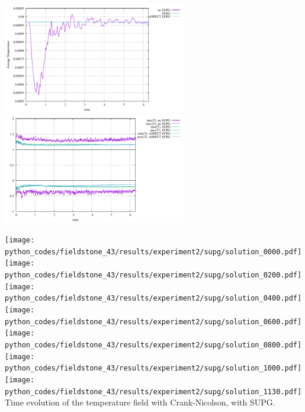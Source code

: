 \begin{center}
\includegraphics[width=8cm]{python_codes/fieldstone_43/results/experiment2/avrg_T}
\includegraphics[width=8cm]{python_codes/fieldstone_43/results/experiment2/stats_T}
\end{center}

\begin{center}
\texttt{[image: python\_codes/fieldstone\_43/results/experiment2/supg/solution\_0000.pdf]}
\texttt{[image: python\_codes/fieldstone\_43/results/experiment2/supg/solution\_0200.pdf]}
\texttt{[image: python\_codes/fieldstone\_43/results/experiment2/supg/solution\_0400.pdf]}
\texttt{[image: python\_codes/fieldstone\_43/results/experiment2/supg/solution\_0600.pdf]}\\
\texttt{[image: python\_codes/fieldstone\_43/results/experiment2/supg/solution\_0800.pdf]}
\texttt{[image: python\_codes/fieldstone\_43/results/experiment2/supg/solution\_1000.pdf]}
\texttt{[image: python\_codes/fieldstone\_43/results/experiment2/supg/solution\_1130.pdf]}\\
{\captionfont Time evolution of the temperature field with Crank-Nicolson, with SUPG.}
\end{center}


